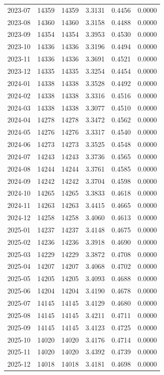\begin{tabular}{lrrrrr}
2023-07 & 14359 & 14359 & 3.3131 & 0.4456 & 0.0000 \\
2023-08 & 14360 & 14360 & 3.3158 & 0.4488 & 0.0000 \\
2023-09 & 14354 & 14354 & 3.3953 & 0.4530 & 0.0000 \\
2023-10 & 14336 & 14336 & 3.3196 & 0.4494 & 0.0000 \\
2023-11 & 14336 & 14336 & 3.3691 & 0.4521 & 0.0000 \\
2023-12 & 14335 & 14335 & 3.3254 & 0.4454 & 0.0000 \\
2024-01 & 14338 & 14338 & 3.3528 & 0.4492 & 0.0000 \\
2024-02 & 14338 & 14338 & 3.3316 & 0.4516 & 0.0000 \\
2024-03 & 14338 & 14338 & 3.3077 & 0.4510 & 0.0000 \\
2024-04 & 14278 & 14278 & 3.3472 & 0.4562 & 0.0000 \\
2024-05 & 14276 & 14276 & 3.3317 & 0.4540 & 0.0000 \\
2024-06 & 14273 & 14273 & 3.3525 & 0.4548 & 0.0000 \\
2024-07 & 14243 & 14243 & 3.3736 & 0.4565 & 0.0000 \\
2024-08 & 14244 & 14244 & 3.3761 & 0.4585 & 0.0000 \\
2024-09 & 14242 & 14242 & 3.3704 & 0.4598 & 0.0000 \\
2024-10 & 14265 & 14265 & 3.3833 & 0.4618 & 0.0000 \\
2024-11 & 14263 & 14263 & 3.4415 & 0.4665 & 0.0000 \\
2024-12 & 14258 & 14258 & 3.4060 & 0.4613 & 0.0000 \\
2025-01 & 14237 & 14237 & 3.4148 & 0.4675 & 0.0000 \\
2025-02 & 14236 & 14236 & 3.3918 & 0.4690 & 0.0000 \\
2025-03 & 14229 & 14229 & 3.3872 & 0.4708 & 0.0000 \\
2025-04 & 14207 & 14207 & 3.4068 & 0.4702 & 0.0000 \\
2025-05 & 14205 & 14205 & 3.4093 & 0.4688 & 0.0000 \\
2025-06 & 14204 & 14204 & 3.4190 & 0.4678 & 0.0000 \\
2025-07 & 14145 & 14145 & 3.4129 & 0.4680 & 0.0000 \\
2025-08 & 14145 & 14145 & 3.4211 & 0.4711 & 0.0000 \\
2025-09 & 14145 & 14145 & 3.4123 & 0.4725 & 0.0000 \\
2025-10 & 14020 & 14020 & 3.4176 & 0.4714 & 0.0000 \\
2025-11 & 14020 & 14020 & 3.4392 & 0.4739 & 0.0000 \\
2025-12 & 14018 & 14018 & 3.4181 & 0.4698 & 0.0000 \\
\bottomrule
\end{tabular}
